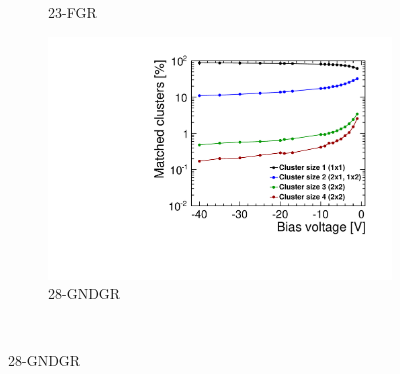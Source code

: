 \begin{figure}[htbp]
\begin{subfigure}[b]{0.33\textwidth}
    \caption{23-FGR}
  \end{subfigure}\hfill
  \begin{subfigure}[b]{0.33\textwidth}
    \includegraphics[width=\textwidth]{./figures/TestBeam/cluSize_biasScan_W0019_L08.pdf}
    \caption{28-GNDGR}
  \end{subfigure} \\


\end{figure}
